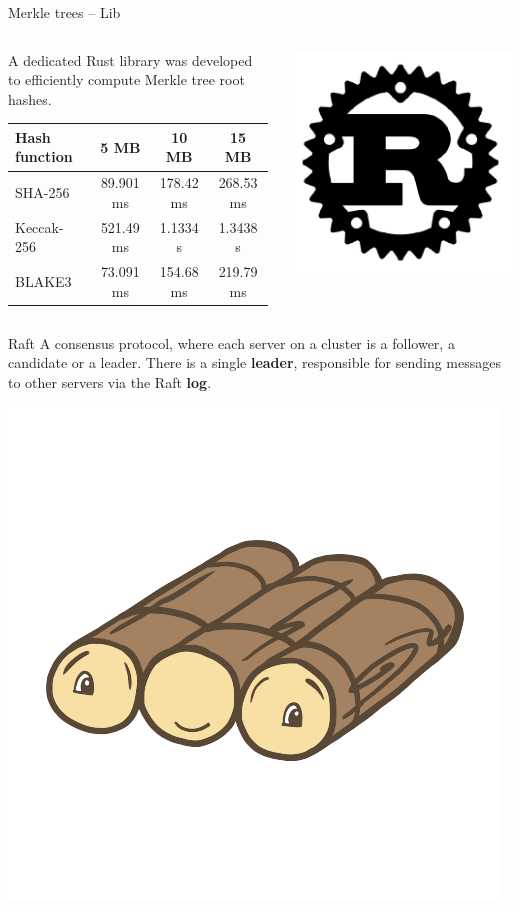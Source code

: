\begin{frame}{Merkle trees -- Lib}
    \begin{columns}[c]
        \begin{column}{0.7\textwidth}
            A dedicated Rust library was developed to efficiently compute Merkle tree root hashes.
            \begin{table}[h!]
                \centering
                \footnotesize %
                \begin{tabular}{|l|c|c|c|}
                \hline
                    \textbf{Hash function} & \textbf{5 MB} & \textbf{10 MB} & \textbf{15 MB} \\
                \hline
                    SHA-256   & 89.901 ms  & 178.42 ms  & 268.53 ms \\
                    Keccak-256 & 521.49 ms & 1.1334 s   & 1.3438 s \\
                    BLAKE3    & 73.091 ms  & 154.68 ms  & 219.79 ms \\
                \hline
                \end{tabular}
            \end{table}
        \end{column}
        \begin{column}{0.3\textwidth}
            \centering
            \includegraphics[width=.4\linewidth]{static/rust-logo.png}
        \end{column}
    \end{columns}

\end{frame}

\begin{frame}{Raft}
A consensus protocol, where each server on a cluster is a follower, a candidate or a leader. There is a single \textbf{leader}, responsible for sending messages to other servers via the Raft \textbf{log}.

\centering
\includegraphics[width=.4\linewidth]{static/raft-logo.png}

\end{frame}
